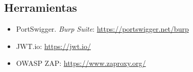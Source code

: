 \documentclass[11pt,a4paper]{article}
\begin{document}
\subsection{Herramientas}
\begin{itemize}[leftmargin=*]
  \item PortSwigger. \textit{Burp Suite}: \url{https://portswigger.net/burp}
  \item JWT.io: \url{https://jwt.io/}
  \item OWASP ZAP: \url{https://www.zaproxy.org/}
\end{itemize}
\end{document}

